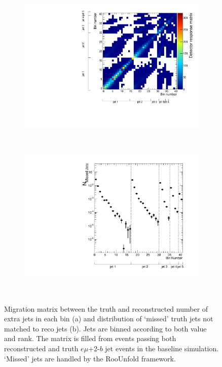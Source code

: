 \begin{figure}
\begin{subfigure}[]{0.45\textwidth}
\includegraphics[width=\textwidth]{fig/Cov/Response.pdf}
\end{subfigure}
~
\begin{subfigure}[]{0.45\textwidth}
\includegraphics[width=\textwidth]{fig/Cov/MissedPt.pdf}
\end{subfigure}
~
\caption{Migration matrix between the truth and reconstructed number of extra jets in each bin (a) and distribution of `missed' truth jets not matched to reco jets (b). Jets are binned according to both \pt value and rank. The matrix is filled from events passing both reconstructed and truth $e\mu$+2-$b$ jet events in the baseline \ttbar simulation. `Missed' jets are handled by the RooUnfold framework.}
\label{f:res}
\end{figure}
